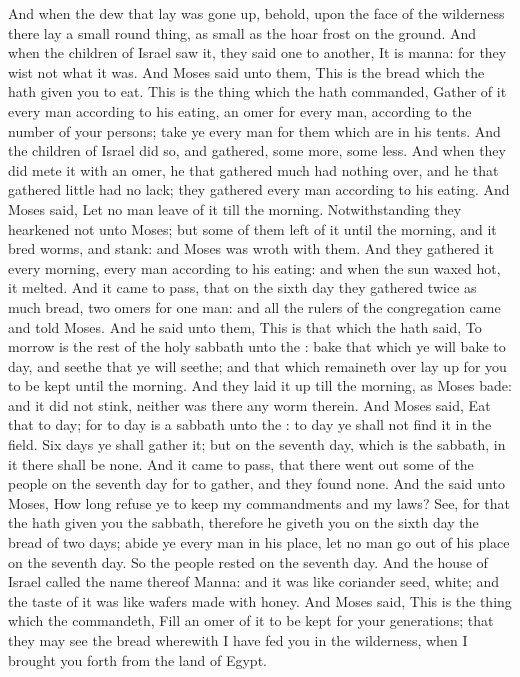 \begin{biblechapter}
\verse And when the dew that lay was gone up, behold, upon the face of the wilderness there lay a small round thing, as small as the hoar frost on the ground.
\verse And when the children of Israel saw it, they said one to another, It is manna: for they wist not what it was. And Moses said unto them, This is the bread which the \LORD hath given you to eat.
\verse This is the thing which the \LORD hath commanded, Gather of it every man according to his eating, an omer for every man, according to the number of your persons; take ye every man for them which are in his tents.
\verse And the children of Israel did so, and gathered, some more, some less.
\verse And when they did mete it with an omer, he that gathered much had nothing over, and he that gathered little had no lack; they gathered every man according to his eating.
\verse And Moses said, Let no man leave of it till the morning.
\verse Notwithstanding they hearkened not unto Moses; but some of them left of it until the morning, and it bred worms, and stank: and Moses was wroth with them.
\verse And they gathered it every morning, every man according to his eating: and when the sun waxed hot, it melted.
\verse And it came to pass, that on the sixth day they gathered twice as much bread, two omers for one man: and all the rulers of the congregation came and told Moses.
\verse And he said unto them, This is that which the \LORD hath said, To morrow is the rest of the holy sabbath unto the \LORD: bake that which ye will bake to day, and seethe that ye will seethe; and that which remaineth over lay up for you to be kept until the morning.
\verse And they laid it up till the morning, as Moses bade: and it did not stink, neither was there any worm therein.
\verse And Moses said, Eat that to day; for to day is a sabbath unto the \LORD: to day ye shall not find it in the field.
\verse Six days ye shall gather it; but on the seventh day, which is the sabbath, in it there shall be none.
\verse And it came to pass, that there went out some of the people on the seventh day for to gather, and they found none.
\verse And the \LORD said unto Moses, How long refuse ye to keep my commandments and my laws?
\verse See, for that the \LORD hath given you the sabbath, therefore he giveth you on the sixth day the bread of two days; abide ye every man in his place, let no man go out of his place on the seventh day.
\verse So the people rested on the seventh day.
\verse And the house of Israel called the name thereof Manna: and it was like coriander seed, white; and the taste of it was like wafers made with honey.
\verse And Moses said, This is the thing which the \LORD commandeth, Fill an omer of it to be kept for your generations; that they may see the bread wherewith I have fed you in the wilderness, when I brought you forth from the land of Egypt.

\end{biblechapter}
